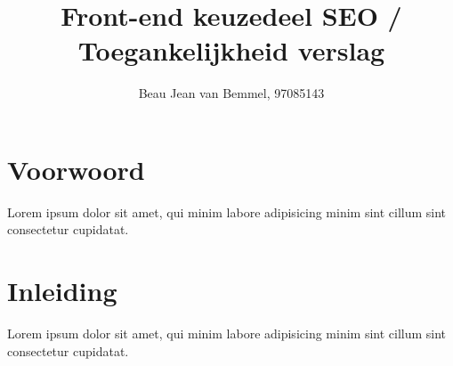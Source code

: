 \documentclass[a4paper]{report}
\title{Front-end keuzedeel SEO / Toegankelijkheid verslag}
\author{Beau Jean van Bemmel, 97085143}
\begin{document}
    \maketitle

    \chapter*{Voorwoord}
    Lorem ipsum dolor sit amet, qui minim labore adipisicing minim sint cillum sint consectetur cupidatat.

    \tableofcontents

    \chapter{Inleiding}
    Lorem ipsum dolor sit amet, qui minim labore adipisicing minim sint cillum sint consectetur cupidatat.
\end{document}
